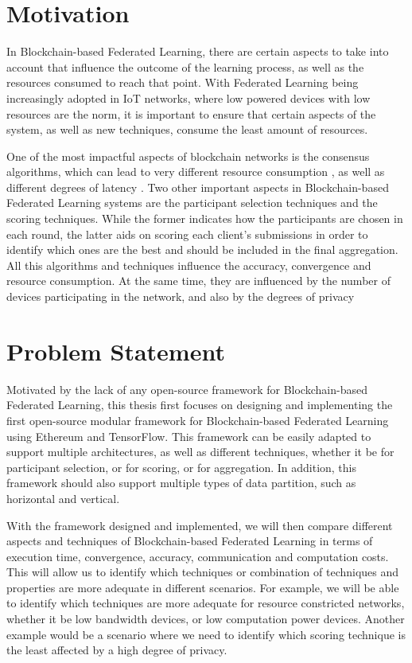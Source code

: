 \section{Motivation}

In Blockchain-based Federated Learning, there are certain aspects to take into account that influence the outcome of the learning process, as well as the resources consumed to reach that point. With Federated Learning being increasingly adopted in IoT networks, where low powered devices with low resources are the norm, it is important to ensure that certain aspects of the system, as well as new techniques, consume the least amount of resources.

One of the most impactful aspects of blockchain networks is the consensus algorithms, which can lead to very different resource consumption \cite{ccaf}, as well as different degrees of latency \cite{Alqahtani_2021}. Two other important aspects in Blockchain-based Federated Learning systems are the participant selection techniques and the scoring techniques. While the former indicates how the participants are chosen in each round, the latter aids on scoring each client's submissions in order to identify which ones are the best and should be included in the final aggregation. All this algorithms and techniques influence the accuracy, convergence and resource consumption. At the same time, they are influenced by the number of devices participating in the network, and also by the degrees of privacy

\section{Problem Statement}

Motivated by the lack of any open-source framework for Blockchain-based Federated Learning, this thesis first focuses on designing and implementing the first open-source modular framework for Blockchain-based Federated Learning using Ethereum and TensorFlow. This framework can be easily adapted to support multiple architectures, as well as different techniques, whether it be for participant selection, or for scoring, or for aggregation. In addition, this framework should also support multiple types of data partition, such as horizontal and vertical.

With the framework designed and implemented, we will then compare different aspects and techniques of Blockchain-based Federated Learning in terms of execution time, convergence, accuracy, communication and computation costs. This will allow us to identify which techniques or combination of techniques and properties are more adequate in different scenarios. For example, we will be able to identify which techniques are more adequate for resource constricted networks, whether it be low bandwidth devices, or low computation power devices. Another example would be a scenario where we need to identify which scoring technique is the least affected by a high degree of privacy.

